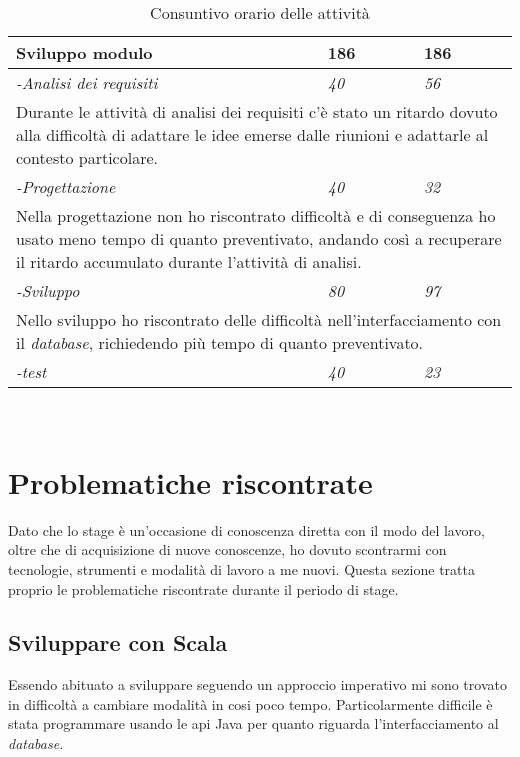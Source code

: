 \begin{table}[h]
	\begin{tabular}{|p{}|p{}|p{}|}
		\toprule
		\textbf{Sviluppo modulo} & \textbf{186} & \textbf{186}  \\ \midrule
		\textit{-Analisi dei requisiti} & \textit{40} & \textit{56} \\ \midrule
		\multicolumn{3}{|p{1\textwidth}|}{Durante le attività di analisi dei requisiti c'è stato un ritardo dovuto alla difficoltà di adattare le idee emerse dalle riunioni e adattarle al contesto particolare.} \\ \midrule
		\textit{-Progettazione} & \textit{40} & \textit{32} \\ \midrule
		\multicolumn{3}{|p{1\textwidth}|}{Nella progettazione non ho riscontrato difficoltà e di conseguenza ho usato meno tempo di quanto preventivato, andando così a recuperare il ritardo accumulato durante l'attività di analisi.} \\ \midrule
		\textit{-Sviluppo} & \textit{80} & \textit{97} \\ \midrule
		\multicolumn{3}{|p{1\textwidth}|}{Nello sviluppo ho riscontrato delle difficoltà nell'interfacciamento con il \textit{database}, richiedendo più tempo di quanto preventivato.} \\ \midrule
		\textit{-test} & \textit{40} & \textit{23} \\ \midrule
		\bottomrule
	\end{tabular}\\
	\par\bigskip
\caption{Consuntivo orario delle attività}
\end{table}


\section{Problematiche riscontrate}
Dato che lo stage è un'occasione di conoscenza diretta con il modo del lavoro, oltre che di acquisizione di nuove conoscenze, ho dovuto scontrarmi con tecnologie, strumenti e modalità di lavoro a me nuovi. Questa sezione tratta proprio le problematiche riscontrate durante il periodo di stage.
\subsection{Sviluppare con Scala}
Essendo abituato a sviluppare seguendo un approccio imperativo mi sono trovato in difficoltà a cambiare modalità in cosi poco tempo. Particolarmente difficile è stata programmare usando le \gls{api} Java per quanto riguarda l'interfacciamento al \textit{database}.

